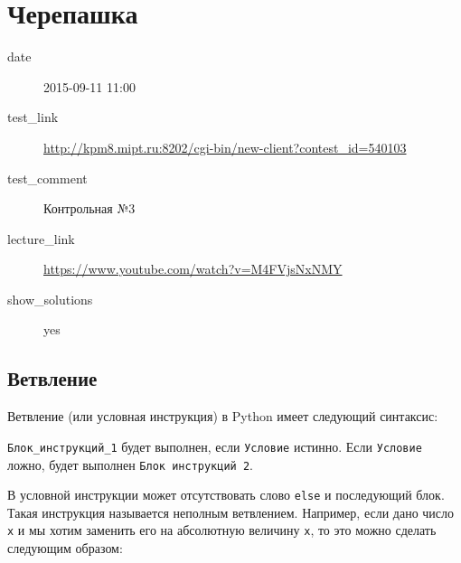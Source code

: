 \section{Черепашка}\label{ux447ux435ux440ux435ux43fux430ux448ux43aux430}

\begin{description}
\item[date]
2015-09-11 11:00
\item[test\_link]
\url{http://kpm8.mipt.ru:8202/cgi-bin/new-client?contest_id=540103}
\item[test\_comment]
Контрольная №3
\item[lecture\_link]
\url{https://www.youtube.com/watch?v=M4FVjsNxNMY}
\item[show\_solutions]
yes
\end{description}

\subsection{Ветвление}\label{ux432ux435ux442ux432ux43bux435ux43dux438ux435}

Ветвление (или условная инструкция) в Python имеет следующий синтаксис:

\begin{Shaded}
\begin{Highlighting}[]
 
\NormalTok{:}
\end{Highlighting}
\end{Shaded}

\texttt{Блок\_инструкций\_1} будет выполнен, если \texttt{Условие}
истинно. Если \texttt{Условие} ложно, будет выполнен
\texttt{Блок\ инструкций\ 2}.

В условной инструкции может отсутствовать слово \texttt{else} и
последующий блок. Такая инструкция называется неполным ветвлением.
Например, если дано число \texttt{x} и мы хотим заменить его на
абсолютную величину \texttt{x}, то это можно сделать следующим образом:

\begin{Shaded}
\begin{Highlighting}[]
 \OperatorTok{<} \NormalTok{:}
    \OperatorTok{=} \OperatorTok{-}
\end{Highlighting}
\end{Shaded}

